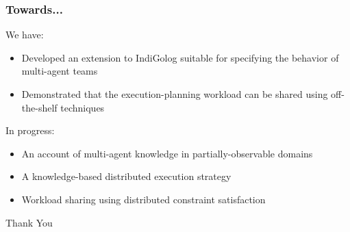 \documentclass[compress]{beamer}
\begin{document}
\begin{frame}
\frametitle{Towards...}
We have:
\begin{itemize}
  \item Developed an extension to IndiGolog suitable for specifying the behavior of multi-agent teams
  \item Demonstrated that the execution-planning workload can be shared using off-the-shelf techniques
\end{itemize}

In progress:
\begin{itemize}
  \item An account of multi-agent knowledge in partially-observable domains
  \item A knowledge-based distributed execution strategy
  \item Workload sharing using distributed constraint satisfaction
\end{itemize}
\end{frame}

\begin{frame}
\centering \large Thank You\\
\end{frame}
\end{document}

